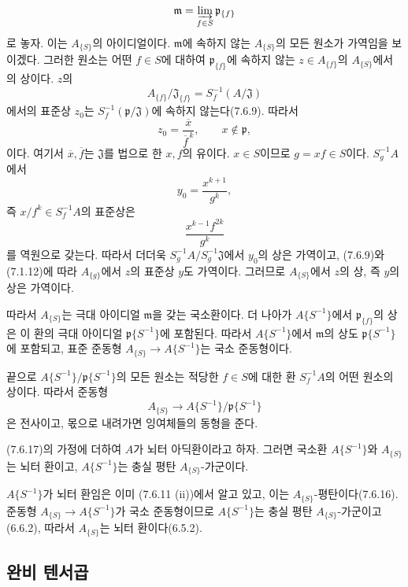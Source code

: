 \[
  \mathfrak m=\varinjlim_{f\in S}\mathfrak p_{\{f\}}
\]
로 놓자. 이는 $A_{\{S\}}$의 아이디얼이다. $\mathfrak m$에 속하지
않는 $A_{\{S\}}$의 모든 원소가 가역임을 보이겠다. 그러한 원소는
어떤 $f\in S$에 대하여
$\mathfrak p_{\{f\}}$에 속하지 않는 $z\in A_{\{f\}}$의
$A_{\{S\}}$에서의 상이다. $z$의
\[
  A_{\{f\}}/\mathfrak J_{\{f\}}
  =S_f^{-1}(A/\mathfrak J)
\]
에서의 표준상 $z_0$는
$S_f^{-1}(\mathfrak p/\mathfrak J)$에 속하지 않는다(7.6.9).
따라서
\[
  z_0=\frac{\overline x}{\overline f^{\,k}},
  \qquad x\notin\mathfrak p,
\]
이다. 여기서 $\overline x,\overline f$는 $\mathfrak J$를 법으로 한
$x,f$의 유이다. $x\in S$이므로 $g=xf\in S$이다. $S_g^{-1}A$에서
\[
  y_0=\frac{x^{k+1}}{g^k},
\]
즉 $x/f^k\in S_f^{-1}A$의 표준상은
\[
  \frac{x^{k-1}f^{2k}}{g^k}
\]
를 역원으로 갖는다. 따라서 더더욱 $S_g^{-1}A/S_g^{-1}\mathfrak J$에서
$y_0$의 상은 가역이고, (7.6.9)와 (7.1.12)에 따라
$A_{\{g\}}$에서 $z$의 표준상 $y$도 가역이다. 그러므로
$A_{\{S\}}$에서 $z$의 상, 즉 $y$의 상은 가역이다.

따라서 $A_{\{S\}}$는 극대 아이디얼 $\mathfrak m$을 갖는
국소환이다. 더 나아가 $A\{S^{-1}\}$에서
$\mathfrak p_{\{f\}}$의 상은 이 환의 극대 아이디얼
$\mathfrak p\{S^{-1}\}$에 포함된다. 따라서
$A\{S^{-1}\}$에서 $\mathfrak m$의 상도
$\mathfrak p\{S^{-1}\}$에 포함되고, 표준 준동형
$A_{\{S\}}\to A\{S^{-1}\}$는 국소 준동형이다.

끝으로 $A\{S^{-1}\}/\mathfrak p\{S^{-1}\}$의 모든 원소는 적당한
$f\in S$에 대한 환 $S_f^{-1}A$의 어떤 원소의 상이다. 따라서
준동형
\[
  A_{\{S\}}\longrightarrow
  A\{S^{-1}\}/\mathfrak p\{S^{-1}\}
\]
은 전사이고, 몫으로 내려가면 잉여체들의 동형을 준다.

\begin{corollary}[7.6.18]
\label{0.7.6.18-ko}
(7.6.17)의 가정에 더하여 $A$가 뇌터 아딕환이라고 하자. 그러면
국소환 $A\{S^{-1}\}$와 $A_{\{S\}}$는 뇌터 환이고,
$A\{S^{-1}\}$는 충실 평탄 $A_{\{S\}}$-가군이다.
\end{corollary}

$A\{S^{-1}\}$가 뇌터 환임은 이미 (7.6.11 (ii))에서 알고 있고,
이는 $A_{\{S\}}$-평탄이다(7.6.16). 준동형
$A_{\{S\}}\to A\{S^{-1}\}$가 국소 준동형이므로
$A\{S^{-1}\}$는 충실 평탄 $A_{\{S\}}$-가군이고(6.6.2), 따라서
$A_{\{S\}}$는 뇌터 환이다(6.5.2).

\subsection{완비 텐서곱}
\label{subsection:0.7.7-ko}

